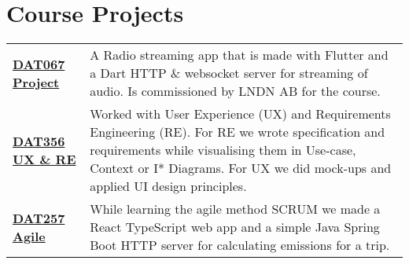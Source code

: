 \section{Course Projects}\label{sec:projects-&-course-projects}
\begin{tabular}{>{\footnotesize\bfseries} p{32pt} >{\footnotesize}p{}}
    \href{https://www.student.chalmers.se/sp/course?course_id=34088}{DAT067 Project} &
    A Radio streaming app that is made with Flutter and a Dart HTTP \& websocket server for streaming of audio.
    Is commissioned by LNDN AB for the course.
    \vspace{3px} \\
    \href{https://www.student.chalmers.se/sp/course?course_id=33536}{DAT356 UX \& RE} &
    Worked with User Experience (UX) and Requirements Engineering (RE).
    For RE we wrote specification and requirements while visualising them in Use-case, Context or I* Diagrams.
    For UX we did mock-ups and applied UI design principles.
    \vspace{3px} \\
    \href{https://www.student.chalmers.se/sp/course?course_id=34092}{DAT257 Agile} &
    While learning the agile method SCRUM we made a React TypeScript web app and a simple Java Spring Boot HTTP server for calculating emissions for a trip.
    \vspace{3px} \\
\end{tabular}

